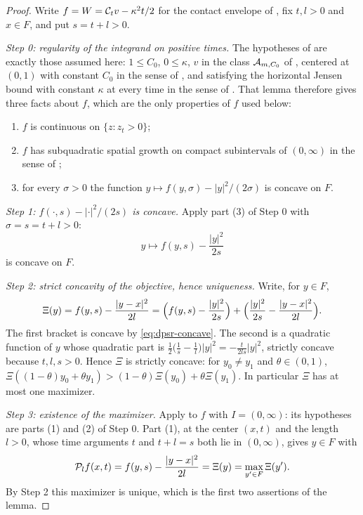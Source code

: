 \begin{proof}
Write $f=W=\mathcal{C}_tv-\kappa^2t/2$ for the contact envelope of
, fix $t,l>0$ and $x\in F$, and put $s=t+l>0$.

\emph{Step 0: regularity of the integrand on positive times.}
The hypotheses of  are exactly those assumed
here: $1\le C_0$, $0\le\kappa$, $v$ in the class $\mathcal{A}_{m,C_0}$ of
, centered at $(0,1)$ with constant $C_0$ in the sense of
, and satisfying the horizontal Jensen bound with constant $\kappa$
at every time in the sense of . That lemma therefore gives three
facts about $f$, which are the only properties of $f$ used below:
\begin{enumerate}
\item $f$ is continuous on $\{z:z_t>0\}$;
\item $f$ has subquadratic spatial growth on compact subintervals of $(0,\infty)$ in the
sense of ;
\item for every $\sigma>0$ the function $y\mapsto f(y,\sigma)-|y|^2/(2\sigma)$ is concave
on $F$.
\end{enumerate}

\emph{Step 1: $f(\cdot,s)-|\cdot|^2/(2s)$ is concave.}
Apply part (3) of Step 0 with $\sigma=s=t+l>0$:
\begin{equation}\label{eq:dpsr-concave}
  y\longmapsto f(y,s)-\frac{|y|^2}{2s}
\end{equation}
is concave on $F$.

\emph{Step 2: strict concavity of the objective, hence uniqueness.}
Write, for $y\in F$,
\[
  \Xi(y)=f(y,s)-\frac{|y-x|^2}{2l}
   =\Bigl(f(y,s)-\frac{|y|^2}{2s}\Bigr)
     +\Bigl(\frac{|y|^2}{2s}-\frac{|y-x|^2}{2l}\Bigr).
\]
The first bracket is concave by \eqref{eq:dpsr-concave}. The second is a
quadratic function of $y$ whose quadratic part is
$\tfrac12\bigl(\tfrac1s-\tfrac1l\bigr)|y|^2=-\tfrac{t}{2ls}|y|^2$, strictly
concave because $t,l,s>0$. Hence $\Xi$ is strictly concave: for $y_0\ne y_1$ and
$\theta\in(0,1)$,
$\Xi((1-\theta)y_0+\theta y_1)>(1-\theta)\Xi(y_0)+\theta\Xi(y_1)$. In
particular $\Xi$ has at most one maximizer.

\emph{Step 3: existence of the maximizer.}
Apply  to $f$ with $I=(0,\infty)$: its hypotheses are parts (1)
and (2) of Step 0. Part (1), at the center $(x,t)$ and the length $l>0$, whose time
arguments $t$ and $t+l=s$ both lie in $(0,\infty)$, gives $y\in F$ with
\begin{equation}\label{eq:dpsr-attain}
  \mathcal{P}_lf(x,t)=f(y,s)-\frac{|y-x|^2}{2l}=\Xi(y)=\max_{y'\in F}\Xi(y') .
\end{equation}
By Step 2 this maximizer is unique, which is the first two assertions of the
lemma.


\end{proof}
